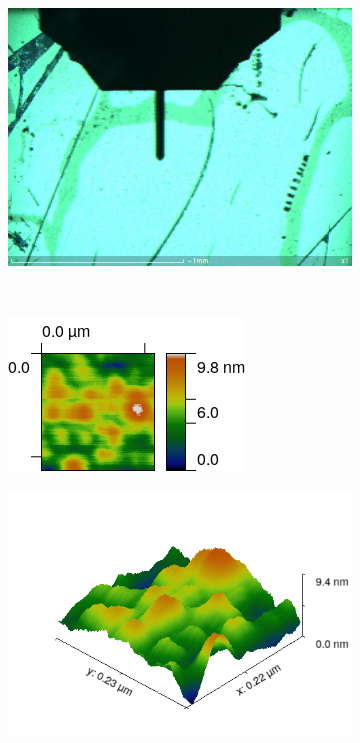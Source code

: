 \documentclass[11pt,a4paper]{article}
\begin{document}
\begin{figure}[H]
\centering
\begin{subfigure}[b]{0.4\textwidth}
\includegraphics[width=\textwidth]{sm_sample3_set}
\caption{}
\label{fig:sample3_light_green_cam}
\end{subfigure}\\
\begin{subfigure}[b]{0.45\textwidth}
\includegraphics[width=\textwidth]{sm_sample3}
\caption{}
\end{subfigure}
\begin{subfigure}[b]{0.45\textwidth}
\includegraphics[width=\textwidth]{sm_sample3_3D_improved}

\end{subfigure}
\end{figure}
\end{document}
